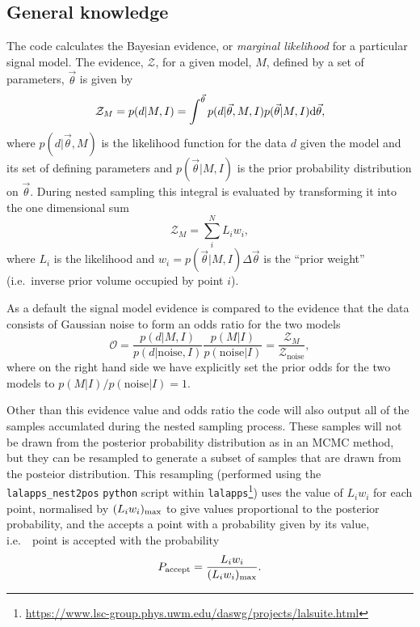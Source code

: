 \documentclass[aps,prd,showpacs,superscriptaddress,twocolumn,preprintnumbers,altaffilletter]{revtex4-1}
\begin{document}
\subsection{General knowledge}

The code calculates the Bayesian evidence, or {\it marginal likelihood} for a particular signal model. The
evidence, $\mathcal{Z}$, for a given model, $M$, defined by a set of parameters, $\vec{\theta}$ is given by
\begin{equation}\label{eq:evidence}
\mathcal{Z}_M = p(d|M,I) = \int^{\vec{\theta}} p(d|\vec{\theta},M,I)p(\vec{\theta}|M,I) {\rm d}\vec{\theta},
\end{equation}
where $p(d|\vec{\theta},M)$ is the likelihood function for the data $d$ given the
model and its set of defining parameters and $p(\vec{\theta}|M,I)$ is the prior probability distribution on
$\vec{\theta}$. During nested sampling this integral is evaluated by transforming it into the one dimensional
sum
\begin{equation}\label{eq:nestedsampev}
\mathcal{Z}_M = \sum_i^N L_i w_i,
\end{equation}
where $L_i$ is the likelihood and $w_i = p(\vec{\theta}|M,I) \Delta\vec{\theta}$ is the ``prior weight''
(i.e.\ inverse prior volume occupied by point $i$).

As a default the signal model evidence is compared to the
evidence that the data consists of Gaussian noise to form an odds ratio for the two models
\begin{equation}\label{eq:oddsratio}
\mathcal{O} = \frac{p(d|M,I)}{p(d|\text{noise},I)}\frac{p(M|I)}{p(\text{noise}|I)} =
\frac{\mathcal{Z}_M}{\mathcal{Z}_{\text{noise}}},
\end{equation}
where on the right hand side we have explicitly set the prior odds for the two models to
$p(M|I)/p(\text{noise}|I) = 1$.

Other than this evidence value and odds ratio the code will also output all of the samples accumlated during
the nested sampling process. These samples will not be drawn from the posterior probability distribution as in
an MCMC method, but they can be resampled to generate a subset of samples that are drawn from the posteior
distribution. This resampling (performed using the {\tt lalapps\_nest2pos} {\tt python} script within
{\tt lalapps}\footnote{\url{https://www.lsc-group.phys.uwm.edu/daswg/projects/lalsuite.html}}) uses the
value of $L_i w_i$ for each point, normalised by $(L_iw_i)_{\rm max}$ to give values proportional to the
posterior probability, and the accepts a point with a probability given by its value, i.e.\ \ point is
accepted with the probability
\begin{equation}
P_{\text{accept}} = \frac{L_i w_i}{(L_iw_i)_{\rm max}}.
\end{equation}
\end{document}
